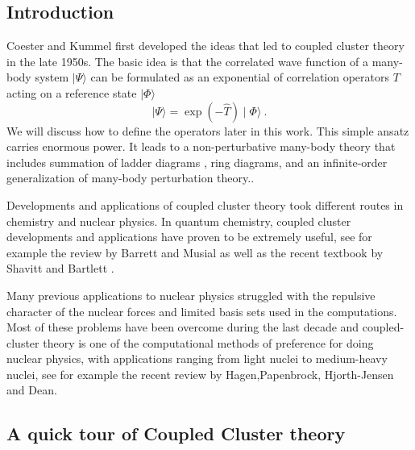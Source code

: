 \subsection{Introduction}
Coester and Kummel first developed the ideas that led to coupled cluster
theory in the late 1950s. The basic idea is that the correlated wave function
of a many-body system $\mid\Psi\rangle$
can be formulated as an exponential of correlation
operators $T$ acting on a reference state $\mid\Phi\rangle$
\[
\mid\Psi\rangle = \exp\left(-\hat{T}\right)\mid\Phi\rangle\ .
\]
We will discuss how to define the operators later in this work. This simple
ansatz carries enormous power. It leads to a non-perturbative many-body
theory that includes summation of ladder diagrams , ring
diagrams, and an infinite-order
generalization of many-body perturbation theory..

Developments and applications of coupled cluster theory took different
routes in chemistry and nuclear physics. In quantum chemistry,
coupled cluster developments and applications have proven to be
extremely useful, see for example the review
by Barrett and Musial as well as the recent textbook
by Shavitt and Bartlett \cite{shavittbartlett2009}.

Many previous applications to nuclear physics struggled
with the repulsive character of the nuclear forces and limited basis
sets used in the computations. Most of these problems have been
overcome during the last decade and coupled-cluster theory is one of
the computational methods of preference for doing nuclear physics,
with applications ranging from light nuclei to medium-heavy nuclei,
see for example the recent review
by Hagen,Papenbrock, Hjorth-Jensen and Dean.


\subsection{A quick tour of Coupled Cluster theory}

